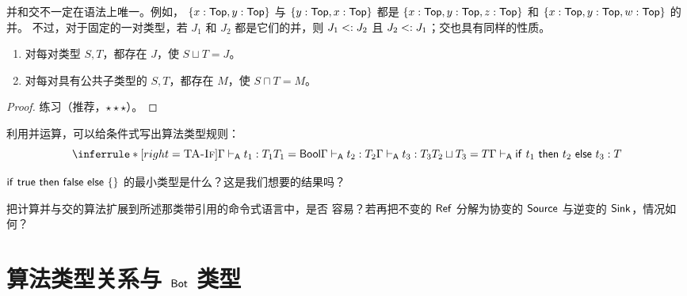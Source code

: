 并和交不一定在语法上唯一。例如，
\(\{x:\mathsf{Top},y:\mathsf{Top}\}\) 与
\(\{y:\mathsf{Top},x:\mathsf{Top}\}\) 都是
\(\{x:\mathsf{Top},y:\mathsf{Top},z:\mathsf{Top}\}\) 和
\(\{x:\mathsf{Top},y:\mathsf{Top},w:\mathsf{Top}\}\) 的并。
不过，对于固定的一对类型，若 \(J_1\) 和 \(J_2\) 都是它们的并，则
\(J_1\mathrel{<:} J_2\) 且 \(J_2\mathrel{<:} J_1\)；交也具有同样的性质。

\taplstatementliststart
\begin{proposition}[并与有界交的存在性]
\label{prop:16.3.2}
\taplstatementlistbreak
\begin{enumerate}
\item 对每对类型 \(S,T\)，都存在 \(J\)，使 \(S\sqcup T=J\)。
\item 对每对具有公共子类型的 \(S,T\)，都存在 \(M\)，使
  \(S\sqcap T=M\)。
\end{enumerate}
\end{proposition}
\begin{proof}
练习（推荐，\(\star\star\star\)）。
\end{proof}

利用并运算，可以给条件式写出算法类型规则：
\[
\inferrule*[right=\textsc{TA-If}]
 {\Gamma\algturnstile t_1:T_1\\T_1=\tapltype{Bool}\\
  \Gamma\algturnstile t_2:T_2\\
  \Gamma\algturnstile t_3:T_3\\
  T_2\sqcup T_3=T}
 {\Gamma\algturnstile
  \mathsf{if}\ t_1\ \mathsf{then}\ t_2\ \mathsf{else}\ t_3:T}
\]

\begin{exercise}[\(\star\star\)]
\label{ex:16.3.3}
\(\mathsf{if}\ \mathsf{true}\ \mathsf{then}\ \mathsf{false}\
\mathsf{else}\ \{\}\) 的最小类型是什么？这是我们想要的结果吗？
\end{exercise}

\begin{exercise}[\(\star\star\star\)]
\label{ex:16.3.4}
把计算并与交的算法扩展到所述那类带引用的命令式语言中，是否
容易？若再把不变的 \(\mathsf{Ref}\) 分解为协变的
\(\mathsf{Source}\) 与逆变的 \(\mathsf{Sink}\)，情况如何？
\end{exercise}

\section{算法类型关系与 \(\mathsf{Bot}\) 类型}
\label{sec:16.4}

